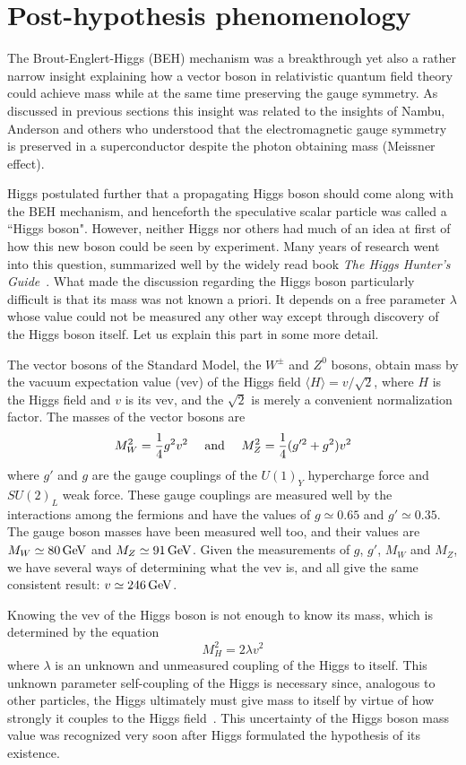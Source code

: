 \documentclass[letter,12pt]{article}
\def\beq{\begin{equation}}
\def\eeq{\end{equation}}
\def\gev{\, {\rm GeV}}
\begin{document}
\section{Post-hypothesis phenomenology}

The Brout-Englert-Higgs (BEH) mechanism was a breakthrough yet also a rather narrow insight explaining how a vector boson in relativistic quantum field theory could achieve mass while at the same time preserving the gauge symmetry. As discussed in previous sections this insight was related to the insights of Nambu, Anderson and others who understood that the electromagnetic gauge symmetry is preserved in a superconductor despite the photon obtaining mass (Meissner effect). 

Higgs postulated further that a propagating Higgs boson should come along with the BEH mechanism, and henceforth the speculative scalar particle was called a ``Higgs boson". However, neither Higgs nor others had much of an idea at first of how this new boson could be seen by experiment.  Many years of research went into this question, summarized well by the widely read book {\it The Higgs Hunter's Guide}~\cite{HHG}. What made the discussion regarding the Higgs boson particularly difficult is that its mass was not known a priori. It depends on a free parameter $\lambda$ whose value could not be measured any other way except through discovery of the Higgs boson itself. Let us explain this part in some more detail.

The vector bosons of the Standard Model, the $W^\pm$ and $Z^0$ bosons, obtain mass by the vacuum expectation value (vev) of the Higgs field $\langle H\rangle = v/\sqrt{2}$, where $H$ is the Higgs field and $v$ is its vev, and the $\sqrt{2}$ is merely a convenient normalization factor.  The masses of the vector bosons are
\beq
M_W^2=\frac{1}{4}g^2v^2~~~~{\rm and}~~~~M_Z^2=\frac{1}{4}(g'^2+g^2)v^2
\eeq
where $g'$ and $g$ are the gauge couplings of the $U(1)_Y$ hypercharge force and $SU(2)_L$ weak force. These gauge couplings are measured well by the interactions among the fermions and have the values of $g\simeq 0.65$ and $g'\simeq 0.35$.  The gauge boson masses have been measured well too, and their values are $M_W\simeq 80\gev$ and $M_Z\simeq 91\gev$. Given the measurements of $g$, $g'$, $M_W$ and $M_Z$, we have several ways of determining what the vev is, and all give the same consistent result: $v\simeq 246\gev$. 

Knowing the vev of the Higgs boson is not enough to know its mass, which is determined by the equation
\beq
M_H^2=2\lambda v^2
\eeq
where $\lambda$ is an unknown and unmeasured coupling of the Higgs to itself. This unknown parameter self-coupling of the Higgs is necessary since, analogous to other particles, the Higgs ultimately must give mass to itself by virtue of how strongly it couples to the Higgs field~\cite{Wells:2009kq}. This uncertainty of the Higgs boson mass value was recognized very soon after Higgs formulated the hypothesis of its existence.
\end{document}
